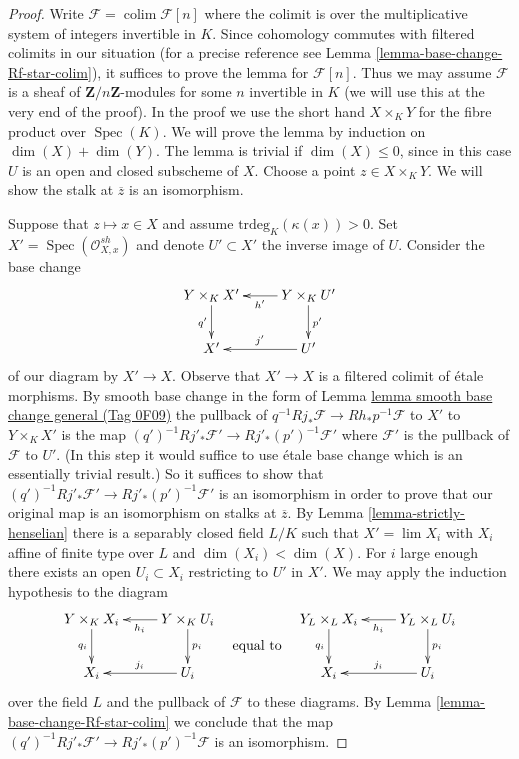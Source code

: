 \documentclass{amsart}
\theoremstyle{plain}
\theoremstyle{definition}
\theoremstyle{remark}
\numberwithin{equation}{subsection}
\def\lim{\mathop{\mathrm{lim}}\nolimits}
\def\colim{\mathop{\mathrm{colim}}\nolimits}
\def\Spec{\mathop{\mathrm{Spec}}}
\begin{document}
\begin{proof}
Write $\mathcal{F} = \colim \mathcal{F}[n]$ where the colimit
is over the multiplicative system of integers invertible in $K$.
Since cohomology commutes with filtered colimits in our situation
(for a precise reference see Lemma \ref{lemma-base-change-Rf-star-colim}),
it suffices to prove the lemma for $\mathcal{F}[n]$. Thus we may
assume $\mathcal{F}$ is a sheaf of $\mathbf{Z}/n\mathbf{Z}$-modules
for some $n$ invertible in $K$ (we will use this at the very end of
the proof). In the proof we use the short hand $X \times_K Y$ for the fibre
product over $\Spec(K)$.
We will prove the lemma by induction on $\dim(X) + \dim(Y)$.
The lemma is trivial if $\dim(X) \leq 0$, since in this case
$U$ is an open and closed subscheme of $X$.
Choose a point $z \in X \times_K Y$. We will show
the stalk at $\overline{z}$ is an isomorphism.

\medskip\noindent
Suppose that $z \mapsto x \in X$ and assume $\text{trdeg}_K(\kappa(x)) > 0$.
Set $X' = \Spec(\mathcal{O}_{X, x}^{sh})$
and denote $U' \subset X'$ the inverse image of $U$.
Consider the base change
$$
\xymatrix{
Y \times_K X' \ar[d]_{q'}  &
Y \times_K U' \ar[l]^{h'} \ar[d]^{p'} \\
X' & U' \ar[l]_{j'}
}
$$
of our diagram by $X' \to X$. Observe that $X' \to X$ is a filtered
colimit of \'etale morphisms. By smooth base change in the form of
Lemma \href{https://stacks.math.columbia.edu/tag/0F09}{lemma smooth base change general (Tag 0F09)} the pullback of
$q^{-1}Rj_*\mathcal{F} \to Rh_*p^{-1}\mathcal{F}$ to $X'$ to
$Y \times_K X'$ is the map
$(q')^{-1}Rj'_*\mathcal{F}' \to Rj'_*(p')^{-1}\mathcal{F}'$ where
$\mathcal{F}'$ is the pullback of $\mathcal{F}$ to $U'$.
(In this step it would suffice to use \'etale base change which is
an essentially trivial result.) So it suffices to show
that $(q')^{-1}Rj'_*\mathcal{F}' \to Rj'_*(p')^{-1}\mathcal{F}'$
is an isomorphism in order to prove that our original
map is an isomorphism on stalks at $\overline{z}$.
By Lemma \ref{lemma-strictly-henselian}
there is a separably closed field $L/K$ such that
$X' = \lim X_i$ with $X_i$ affine of finite type over $L$
and $\dim(X_i) < \dim(X)$. For $i$ large enough there
exists an open $U_i \subset X_i$ restricting to $U'$ in $X'$.
We may apply the induction hypothesis to the diagram
$$
\vcenter{
\xymatrix{
Y \times_K X_i \ar[d]_{q_i}  &
Y \times_K U_i \ar[l]^{h_i} \ar[d]^{p_i} \\
X_i & U_i \ar[l]_{j_i}
}
}
\quad\text{equal to}\quad
\vcenter{
\xymatrix{
Y_L \times_L X_i \ar[d]_{q_i}  &
Y_L \times_L U_i \ar[l]^{h_i} \ar[d]^{p_i} \\
X_i & U_i \ar[l]_{j_i}
}
}
$$
over the field $L$ and the pullback of $\mathcal{F}$ to these diagrams.
By Lemma \ref{lemma-base-change-Rf-star-colim} we conclude that the map
$(q')^{-1}Rj'_*\mathcal{F}' \to Rj'_*(p')^{-1}\mathcal{F}$ is an isomorphism.


\end{proof}
\end{document}
